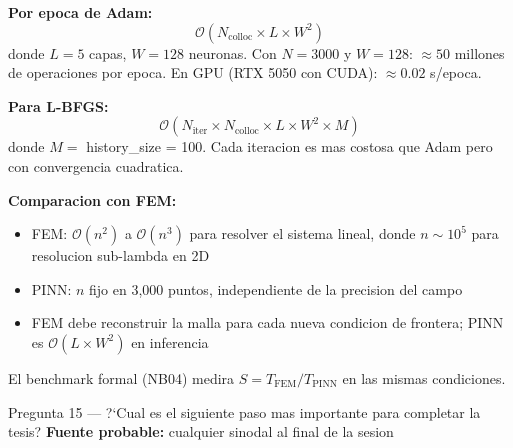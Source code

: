 \begin{answerbox}
\textbf{Por epoca de Adam:}
\[
  \mathcal{O}(N_\text{colloc} \times L \times W^2)
\]
donde $L = 5$ capas, $W = 128$ neuronas. Con $N = 3000$ y $W = 128$: $\approx 50$ millones
de operaciones por epoca. En GPU (RTX 5050 con CUDA): $\approx 0.02$ s/epoca.

\textbf{Para L-BFGS:}
\[
  \mathcal{O}(N_\text{iter} \times N_\text{colloc} \times L \times W^2 \times M)
\]
donde $M = $ history\_size = 100. Cada iteracion es mas costosa que Adam pero
con convergencia cuadratica.

\textbf{Comparacion con FEM:}
\begin{itemize}
  \item FEM: $\mathcal{O}(n^2)$ a $\mathcal{O}(n^3)$ para resolver el sistema lineal,
        donde $n \sim 10^5$ para resolucion sub-lambda en 2D
  \item PINN: $n$ fijo en 3,000 puntos, independiente de la precision del campo
  \item FEM debe reconstruir la malla para cada nueva condicion de frontera;
        PINN es $\mathcal{O}(L \times W^2)$ en inferencia
\end{itemize}

El benchmark formal (NB04) medira $S = T_\text{FEM}/T_\text{PINN}$ en las mismas
condiciones.
\end{answerbox}

\vspace{8pt}

\begin{qabox}{Pregunta 15 --- ?`Cual es el siguiente paso mas importante para completar la tesis?}
\textbf{Fuente probable:} cualquier sinodal al final de la sesion
\end{qabox}

